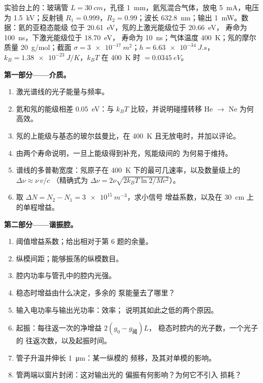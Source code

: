 \begin{problem}\label{pb:b2:laser:1}
实验台上的：玻璃管 $L = \qty{30}{cm}$，孔径
\qty{1}{mm}，氦氖混合气体，放电 \qty{5}{mA}，电压为
\qty{1.5}{kV}；反射镜 $R_1 = 0.999$，$R_2 = 0.99$；波长
\qty{632.8}{nm}；输出 \qty{1}{mW}。数据：氦的亚稳态能级
位于 \qty{20.61}{eV}，氖的上激光能级位于 \qty{20.66}{eV}，
寿命为 \qty{100}{ns}，下激光能级位于 \qty{18.70}{eV}，
寿命为 \qty{10}{ns}；气体温度 \qty{400}{K}；氖的摩尔质量
\qty{20}{g/mol}；截面 $\sigma = \qty{3e-17}{m^2}$；$h =
\qty{6.63e-34}{J.s}$，$k_B = \qty{1.38e-23}{J/K}$，$k_BT$ 在 \qty{400}{K} 时
$= \qty{0.0345}{eV}$。

\textbf{第一部分——介质。}
\begin{enumerate}
  \item 激光谱线的光子能量与频率。
  \item 氦和氖的能级相差 \qty{0.05}{eV}：与
        $k_BT$ 比较，并说明碰撞转移 He $\to$ Ne 为何
        高效。
  \item 氖的上能级与基态的玻尔兹曼比，在
        \qty{400}{K} 且无放电时，并加以评论。
  \item 由两个寿命说明，一旦上能级得到补充，氖能级间的
        为何易于维持。
  \item 谱线的多普勒宽度：氖原子在
        \qty{400}{K} 下的最可几速率，以及数量级上的 $\Delta\nu \approx \nu\,v/c$
        （精确式为 $\Delta\nu = 2\nu\sqrt{2k_BT\ln2/Mc^2}$）。
  \item 取 $\Delta N = N_2 - N_1 = \qty{3e15}{m^{-3}}$，求小信号
        增益系数，以及在 \qty{30}{cm} 上的单程增益。
\end{enumerate}

\textbf{第二部分——谐振腔。}
\begin{enumerate}[resume]
  \item 阈值增益系数；给出相对于第 6 题的余量。
  \item 纵模间距；能够振荡的纵模数目。
  \item 腔内功率与管孔中的腔内光强。
  \item 稳态时增益由什么决定，多余的
        泵能量去了哪里？
  \item 输入电功率与输出光功率：效率；
        说明其如此之低的两个原因。
  \item 起振：每往返一次的净增益 $2(g_0 - g_{\text{阈}})L$，
        稳态时腔内的光子数，一个光子的
        往返次数，以及起振时间。
  \item 管子升温并伸长 \qty{1}{\micro m}：某一纵模的
        频移，及其对单模的影响。
  \item 管两端以窗片封闭：这对输出光的
        偏振有何影响？为何它不引入
        损耗？
\end{enumerate}


\end{problem}
